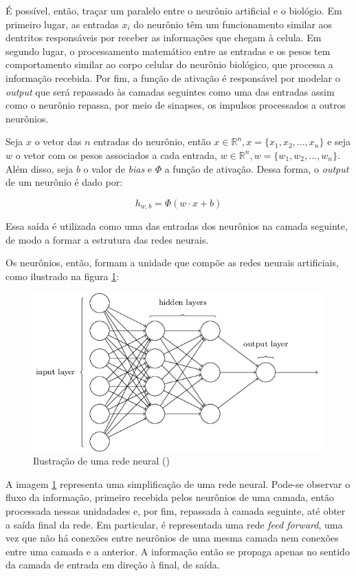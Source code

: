 É possível, então, traçar um paralelo entre o neurônio
artificial e o biológio. Em primeiro lugar, as entradas 
$x_i$ do neurônio  têm um funcionamento similar aos 
dentritos responsáveis 
por receber as informações que chegam à celula. Em segundo lugar,
o processamento matemático entre as entradas e os pesos 
tem comportamento similar ao corpo 
celular do neurônio biológico, que processa a informação 
recebida. Por fim, a função de ativação é responsável por modelar o 
\textit{output} que será repassado às camadas seguintes como uma das entradas
assim como o neurônio repassa, por meio de sinapses, os impulsos processados
a outros neurônios.


Seja $x$ o vetor das $n$ entradas do neurônio, então
$x \in \mathbb{R}^n, x=\{x_1, x_2, ..., x_n\}$ e seja 
$w$ o vetor com os pesos associados a cada entrada, 
$w \in \mathbb{R}^n, w=\{w_1, w_2, ..., w_n\}$. Além disso,
seja $b$ o valor de \textit{bias} e $\Phi$ a função de ativação.
Dessa forma, o \textit{output} de um neurônio é dado por:
 
\begin{equation}
  h_{w,b} = \Phi(w \cdot x + b)
\end{equation}

Essa saída é utilizada como uma das entradas dos neurônios
na camada seguinte, de modo a formar a estrutura das redes 
neurais. 


Os neurônios,
então, formam a unidade que compõe as redes neurais artificiais,
como ilustrado na figura \ref{fig:redeneural}:

\begin{figure}[H] 
  \includegraphics[width= 12cm]{../figuras/redes/rede_mlp.png}
  \caption{Ilustração de uma rede neural (\cite{neuralnetworksanddeeplearning})}
  \label{fig:redeneural}
\end{figure}

A imagem \ref{fig:redeneural} representa uma simplificação de uma 
rede neural. Pode-se observar o fluxo da informação, primeiro recebida pelos 
neurônios de uma camada, então processada nessas unidadades e, por fim, repassada à camada 
seguinte, até obter a saída final da rede. Em particular, é representada uma
rede \textit{feed forward}, uma vez que não há conexões entre neurônios de uma 
mesma camada nem conexões entre uma camada e a anterior. A informação então 
se propaga apenas no sentido da camada de entrada em direção à final, de saída.

